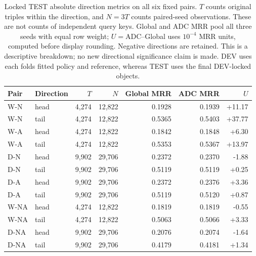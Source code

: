 \begin{table}[htbp]
\centering\footnotesize\setlength{\tabcolsep}{3pt}
\caption{Locked TEST absolute direction metrics on all six fixed pairs. $T$ counts original triples within the direction, and $N=3T$ counts paired-seed observations. These are not counts of independent query keys. Global and ADC MRR pool all three seeds with equal row weight; $U=$ADC--Global uses $10^{-4}$ MRR units, computed before display rounding. Negative directions are retained. This is a descriptive breakdown; no new directional significance claim is made. DEV uses each fold\textquotesingle s fitted policy and reference, whereas TEST uses the final DEV-locked objects.}
\label{tab:group-direction_test}
\begin{tabular}{llrrrrr}
\toprule
Pair & Direction & $T$ & $N$ & Global MRR & ADC MRR & $U$\\
\midrule
W-N & head & 4,274 & 12,822 & 0.1928 & 0.1939 & +11.17\\
W-N & tail & 4,274 & 12,822 & 0.5365 & 0.5403 & +37.77\\
W-A & head & 4,274 & 12,822 & 0.1842 & 0.1848 & +6.30\\
W-A & tail & 4,274 & 12,822 & 0.5353 & 0.5367 & +13.97\\
D-N & head & 9,902 & 29,706 & 0.2372 & 0.2370 & -1.88\\
D-N & tail & 9,902 & 29,706 & 0.5119 & 0.5119 & +0.25\\
D-A & head & 9,902 & 29,706 & 0.2372 & 0.2376 & +3.36\\
D-A & tail & 9,902 & 29,706 & 0.5119 & 0.5120 & +0.87\\
W-NA & head & 4,274 & 12,822 & 0.1819 & 0.1819 & -0.55\\
W-NA & tail & 4,274 & 12,822 & 0.5063 & 0.5066 & +3.33\\
D-NA & head & 9,902 & 29,706 & 0.2076 & 0.2074 & -1.64\\
D-NA & tail & 9,902 & 29,706 & 0.4179 & 0.4181 & +1.34\\
\bottomrule
\end{tabular}
\end{table}
